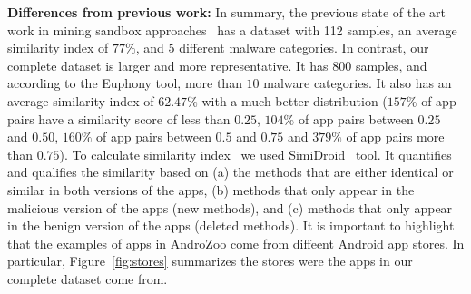 \textbf{Differences from previous work: } In summary, the previous state of the art work in mining sandbox approaches~\cite{DBLP:conf/wcre/BaoLL18} has a dataset with 112 samples, an average similarity index of $77\%$, and $5$ different malware categories. In contrast, our complete dataset is larger and more representative. It has 800 samples, and according to the Euphony\cite{hurier2017euphony} tool, more than $10$ malware categories. It also has an average similarity index of $62.47\%$ with a much better distribution ($157\%$ of
app pairs have a similarity score of less than $0.25$, $104\%$ of app pairs between $0.25$ and $0.50$, $160\%$ of app pairs between $0.5$ and $0.75$  and $379\%$ of app pairs more than $0.75$). To calculate similarity index~\cite{DBLP:conf/wcre/0029BKT16} we used SimiDroid~\cite{DBLP:conf/trustcom/0029BK17} tool. It quantifies and qualifies the similarity based on (a) the methods that are either identical or similar in both versions of the apps, (b) methods that only appear in the malicious version of the apps (new methods), and (c) methods that only appear in the benign version of the apps (deleted methods). It is important to highlight that the examples of apps in AndroZoo come from diffeent Android app stores. In particular,
Figure~\ref{fig:stores} summarizes the stores were the apps in our complete dataset come from.  





